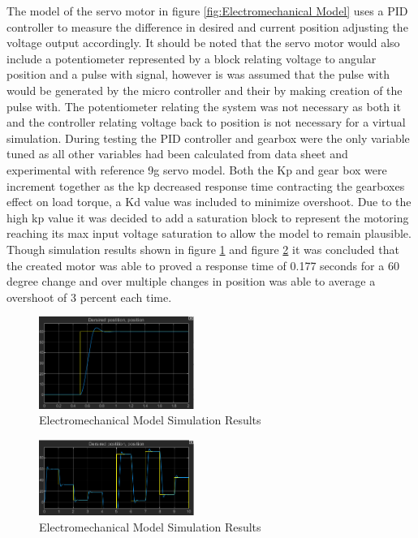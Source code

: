 The model of the servo motor in figure \ref{fig:Electromechanical Model} uses a PID controller to measure the difference in desired and current position adjusting the voltage output accordingly. It should be noted that the servo motor would also include a potentiometer represented by a block relating voltage to angular position and a pulse with signal, however is was assumed that the pulse with would be generated by the micro controller and their by making creation of the pulse with. The potentiometer relating the system was not necessary as both it and the controller relating voltage back to position is not necessary for a virtual simulation. During testing the PID controller and gearbox were the only variable tuned as all other variables had been calculated from data sheet and experimental with reference 9g servo model. Both the Kp and gear box were increment together as the kp decreased response time contracting the gearboxes effect on load torque, a Kd value was included to minimize overshoot. Due to the high kp value it was decided to add a saturation block to represent the motoring reaching its max input voltage saturation to allow the model to remain plausible. Though simulation results shown in figure \ref{fig:Electromechanical Model Simulation Results} and figure \ref{fig:Electromechanical Model Simulation varying input positions}  it was concluded that the created motor was able to proved a response time of 0.177 seconds for a 60 degree change and over multiple changes in position was able to average a overshoot of 3 percent each time. 
\begin{figure}[h]
 \centering
   \includegraphics[width = 0.45\textwidth]{figures/15.png}                \caption{Electromechanical Model Simulation Results}
   \label{fig:Electromechanical Model Simulation Results}
\end{figure}
\begin{figure}[h]
 \centering
   \includegraphics[width = 0.45\textwidth]{figures/16.png}                \caption{Electromechanical Model Simulation Results}
   \label{fig:Electromechanical Model Simulation varying input positions}
\end{figure}







